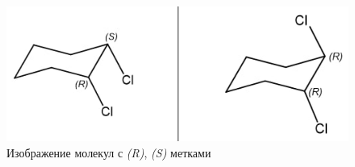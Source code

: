 \begin{figure}[h!] 
	\center
	\includegraphics [scale=0.68] {my_folder/images/rs}
	\caption{Изображение молекул с \textit{(R)}, \textit{(S)} метками \cite{stereochem}} 
	\label{fig:rs}  
\end{figure}




